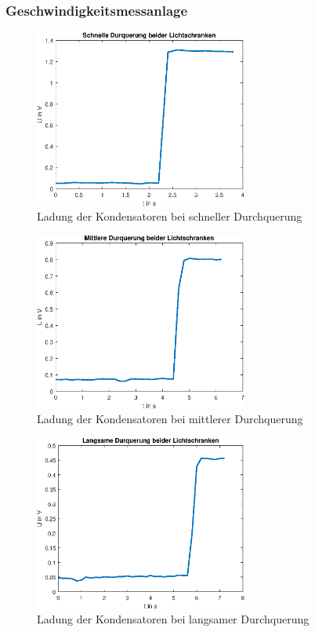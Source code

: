 \subsubsection{Geschwindigkeitsmessanlage}

\begin{figure}[htb]
    \includegraphics[width=7cm]{./res/Lichtschranke_2_schnell_Messung}
    \caption{Ladung der Kondensatoren bei schneller Durchquerung}
    \label{fig:DurchquerungSchnell}
\end{figure}

\newpage

\begin{figure}[htb]
    \includegraphics[width=7cm]{./res/Lichtschranke_2_medium_Messung}
    \caption{Ladung der Kondensatoren bei mittlerer Durchquerung}
    \label{fig:DurchquerungMedium}
\end{figure}

\begin{figure}[htb]
    \includegraphics[width=7cm]{./res/Lichtschranke_2_langsam_Messung}
    \caption{Ladung der Kondensatoren bei langsamer Durchquerung}
    \label{fig:DurchquerungLangsam}
\end{figure}

